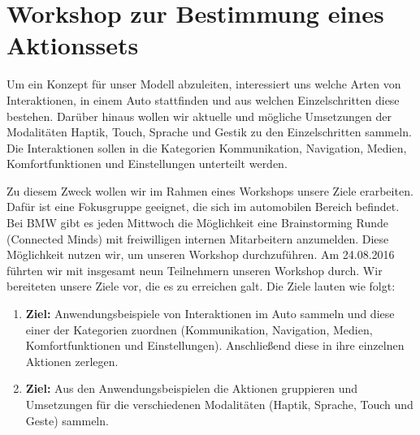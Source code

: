 \chapter[Workshop Connected Minds]{Workshop zur Bestimmung eines Aktionssets}\label{cha:Workshop}
Um ein Konzept für unser Modell abzuleiten, interessiert uns welche Arten von Interaktionen, in einem Auto stattfinden und aus welchen Einzelschritten diese bestehen. Darüber hinaus wollen wir aktuelle und mögliche Umsetzungen der Modalitäten Haptik, Touch, Sprache und Gestik zu den Einzelschritten sammeln. Die Interaktionen sollen in die Kategorien Kommunikation, Navigation, Medien, Komfortfunktionen und Einstellungen unterteilt werden.

Zu diesem Zweck wollen wir im Rahmen eines Workshops unsere Ziele erarbeiten. Dafür ist eine Fokusgruppe geeignet, die sich im automobilen Bereich befindet.   
Bei BMW gibt es jeden Mittwoch die Möglichkeit eine Brainstorming Runde (Connected Minds) mit freiwilligen internen Mitarbeitern anzumelden. Diese Möglichkeit nutzen wir, um unseren Workshop durchzuführen.
Am 24.08.2016 führten wir mit insgesamt neun Teilnehmern unseren Workshop durch. 
Wir bereiteten unsere Ziele vor, die es zu erreichen galt. Die Ziele lauten wie folgt:  
\begin{enumerate}
	\item \textbf{Ziel:} Anwendungsbeispiele von Interaktionen im Auto sammeln und diese einer der Kategorien zuordnen (Kommunikation, Navigation, Medien, Komfortfunktionen und Einstellungen). Anschließend diese in ihre einzelnen Aktionen zerlegen. 
	\item \textbf{Ziel:} Aus den Anwendungsbeispielen die Aktionen gruppieren und Umsetzungen für die verschiedenen Modalitäten (Haptik, Sprache, Touch und Geste) sammeln.
\end{enumerate}
